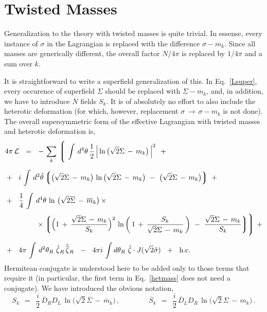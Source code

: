 \documentclass[epsfig,12pt]{article}
\def\beq{\begin{equation}}
\def\eeq{\end{equation}}
\newcommand{\cell}{{\mathcal L}}
\newcommand{\ov}{\overline}
\newcommand{\lgr}{\left\lgroup}
\newcommand{\rgr}{\right\rgroup}
\newcommand{\hsigma}{\hat\sigma{}}
\newcommand{\hzeta}{\hat\zeta{}}
\newcommand{\hbzeta}{\hat{\ov\zeta}{}}
\begin{document}
\section{Twisted Masses}
\label{stwist}
	
	Generalization to the theory with twisted masses is quite trivial. 
	In essense, every instance of $ \sigma $ in the Lagrangian is replaced
	with the difference $ \sigma - m_k $.
	Since all masses are generically different, the overall factor $ N/4\pi $ is
	replaced by $ 1/4\pi $ and a sum over $ k $.

	It is straightforward to write a superfield generalization of this.
	In Eq.~\eqref{Lsuper}, every occurence of superfield $ \Sigma $ 
	should be replaced with $ \Sigma - m_k $, and, in addition,
	we have to introduce $ N $ fields $ S_k $.
	It is of absolutely no effort to also include the heterotic deformation
	(for which, however, replacement $ \sigma \,\to\, \sigma - m_k $ is not done).
	The overall supersymmetric form of the effective Lagrangian with 
	twisted masses and heterotic deformation is,
\begin{align}
%
\notag
	& 4\pi\, \cell    ~~=~~     
			-\, \sum_k\, \Bigg\lgroup\,
			\int\, d^4\theta\, \frac{1}{2}\, \Big| \ln \big(\sqrt{2}\Sigma \,-\, m_k \big)\, \Big|^2
			~~+
	\\[2mm]
%
\notag
			&
			+~~
			i\, \int\, d^2\tilde\theta 
			\lgr
			\big( \sqrt{2}\Sigma \,-\, m_k \big)\, \ln \big( \sqrt{2}\Sigma \,-\, m_k \big)  ~-~ 
					\big( \sqrt{2}\Sigma \,-\, m_k \big)
			\rgr \!\!
			~~+
	\\[2mm]
%
\label{hetmass}
			&
			+~~ 
			\frac{1}{4}\, \int\, d^4\theta\, \ln\, \big( \sqrt{2}\ov\Sigma \,-\, \ov m{}_k \big)\, \times
	\\[1mm]
%
\notag
			&
			\qquad\qquad~
			\times
			\bigg\lgroup \Big( 1 \,+\, \frac{\sqrt{2}\Sigma \,-\, m_k}{S_k} \Big)^2\,
				\ln \left(\, 1 \,+\, \frac{S_k}{\sqrt{2}\Sigma \,-\, m_k} \,\right) ~-~
				\frac{\sqrt{2}\Sigma \,-\, m_k}{S_k} \bigg\rgroup \Bigg\rgroup \!\!
			~~+
	\\[2mm]
%
\notag
			&
			+~~
			4\pi\, \int\, d^2\theta_R\,\, \hzeta_R\, \hbzeta_R
			~~-~~
			4\pi i\, \int d\theta_R\,\, \hzeta\cdot J(\sqrt{2}\hsigma)
			~~+~~
			\text{h.c.}
\end{align}
	Hermitean conjugate is understood here to be added only to those terms that require it
	(in particular, the first term in Eq.~\eqref{hetmass} does not need a conjugate).
	We have introduced the obvious notation,
\beq
	S_k    ~~=~~    \frac{i}{2}\, \ov D{}_R D_L\, \ln \big( \sqrt{2}\ov\Sigma \,-\, \ov m{}_k \big)\,,
	\qquad\qquad
	\ov S{}_k    ~~=~~    \frac{i}{2}\, \ov D{}_L D_R\, \ln \big( \sqrt{2}\Sigma \,-\, m_k \big)\,.
\eeq
\end{document}

